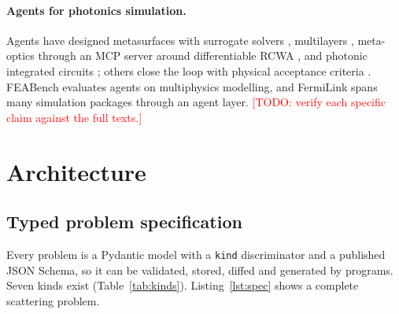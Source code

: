 \documentclass[11pt]{article}
\newcommand{\todo}[1]{\textcolor{red}{[TODO: #1]}}
\newcommand{\code}[1]{\texttt{#1}}
\begin{document}
\paragraph{Agents for photonics simulation.}
Agents have designed metasurfaces with surrogate solvers \cite{Lupoiu2025metachat}, multilayers
\cite{Kim2025llmphotonics}, meta-optics through an MCP server around differentiable RCWA
\cite{Huang2025mcp}, and photonic integrated circuits \cite{Sharma2025phido,Wu2025picbench,Picopilot2026};
others close the loop with physical acceptance criteria \cite{Kharel2026,Biswas2026,Halo2026}.
FEABench \cite{Mudur2025feabench} evaluates agents on multiphysics modelling, and FermiLink
\cite{Fermilink2026} spans many simulation packages through an agent layer.
\todo{verify each specific claim against the full texts.}

\section{Architecture}
\label{sec:arch}

\subsection{Typed problem specification}
Every problem is a Pydantic \cite{Pydantic} model with a \code{kind} discriminator and a published
JSON Schema, so it can be validated, stored, diffed and generated by programs. Seven kinds exist
(Table~\ref{tab:kinds}). Listing~\ref{lst:spec} shows a complete scattering problem.
\end{document}
